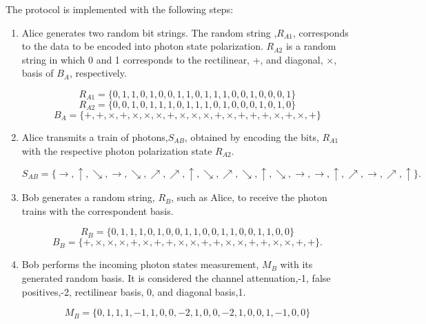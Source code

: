 The protocol is implemented with the following steps:
\begin{enumerate}
	\item Alice generates two random bit strings. The random string ,$R_{A1}$, corresponds to the data to be encoded into photon state polarization. $R_{A2}$ is a random string in which 0 and 1 corresponds to the rectilinear, +, and diagonal, $\times$, basis of $B_{A}$, respectively.
	
	$$ R_{A1} = \{0,1,1,0,1,0,0,1,1,0,1,1,1,0,0,1,0,0,0,1\}$$
	$$ R_{A2} = \{0,0,1,0,1,1,1,0,1,1,1,0,1,0,0,0,1,0,1,0\}$$
	$$ B_{A} = \{+,+,\times,+,\times, \times, \times, +,\times, \times, \times,+,\times,+,+,+,\times,+,\times,+\}$$
	
	\item Alice transmits a train of photons,$S_{AB}$, obtained by encoding the bits, $R_{A1}$ with the respective photon polarization state $R_{A2}$.
	
	$$S_{AB} = \{\to, \uparrow, \searrow, \to, \searrow, \nearrow, \nearrow, \uparrow, \searrow, \nearrow, \searrow, \uparrow, \searrow, \to, \to, \uparrow, \nearrow, \to, \nearrow, \uparrow\}.$$
	
	\item Bob generates a random string, $R_{B}$, such as Alice, to receive the photon trains with the correspondent basis.
	
	$$ R_{B} = \{0,1,1,1,0,1,0,0,1,1,0,0,1,1,0,0,1,1,0,0\}$$
	$$B_{B} = \{ +,\times,\times,\times,+,\times,+,+,\times,\times,+,+,\times,\times,+,+,\times,\times,+,+\}.$$
	
	\item Bob performs the incoming photon states measurement, $M_{B}$ with its generated random basis. It is considered the channel attenuation,-1, false positives,-2, rectilinear basis, 0, and diagonal basis,1.
	
	$$M_{B} = \{0,1,1,1,-1,1,0,0,-2,1,0,0,-2,1,0,0,1,-1,0,0\}$$	
	
\end{enumerate}

